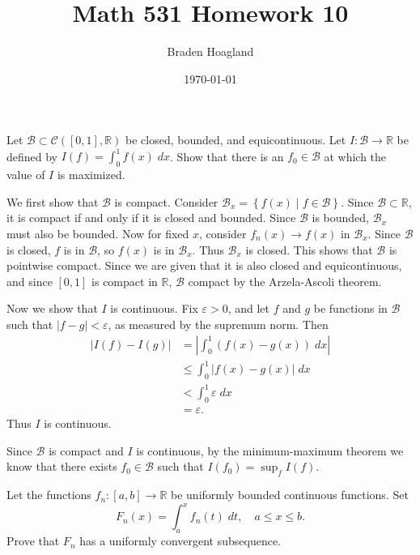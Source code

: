 \documentclass[10pt]{amsart}
\newenvironment{exercise}[1]{%
        \vspace{10mm}
        \renewcommand\themanualtheoreminner{#1}%
  \manualtheoreminner
}\hrulefill{\endmanualtheoreminner}
\begin{document}
\title{Math 531 Homework 10}
\author{Braden Hoagland}
\date{\today}
\maketitle

\begin{exercise}{Page 274, Ex. 4}
	Let $\mathcal{B}\subset \mathcal{C}([0,1], \mathbb{R})$ be closed, bounded, and equicontinuous. Let $I:\mathcal{B}\to\mathbb{R}$ be defined by $I(f) = \int_{0}^{1} f(x) \;dx$. Show that there is an $f_0 \in \mathcal{B}$ at which the value of $I$ is maximized.
\end{exercise}

We first show that $\mathcal{B}$ is compact. Consider $\mathcal{B}_x = \left\{ f(x) \;|\; f \in \mathcal{B} \right\}$. Since $\mathcal{B} \subset \mathbb{R}$, it is compact if and only if it is closed and bounded. Since $\mathcal{B}$ is bounded, $\mathcal{B}_x$ must also be bounded. Now for fixed $x$, consider $f_n(x) \to f(x)$ in $\mathcal{B}_x$. Since $\mathcal{B}$ is closed, $f$ is in $\mathcal{B}$, so $f(x)$ is in $\mathcal{B}_x$. Thus $\mathcal{B}_x$ is closed. This shows that $\mathcal{B}$ is pointwise compact. Since we are given that it is also closed and equicontinuous, and since $[0,1]$ is compact in $\mathbb{R}$, $\mathcal{B}$ compact by the Arzela-Ascoli theorem.

Now we show that $I$ is continuous. Fix $\varepsilon>0$, and let $f$ and $g$ be functions in $\mathcal{B}$ such that $|f-g| < \varepsilon$, as measured by the supremum norm. Then
\begin{align*}
	|I(f) - I(g)| &= \left| \int_{0}^{1} (f(x)-g(x)) \;dx \right| \\
		      &\leq \int_{0}^{1} |f(x)-g(x)| \;dx \\
		      &< \int_{0}^{1} \varepsilon \;dx \\
		      &= \varepsilon.
\end{align*}
Thus $I$ is continuous.

Since $\mathcal{B}$ is compact and $I$ is continuous, by the minimum-maximum theorem we know that there exists $f_0 \in \mathcal{B}$ such that $I(f_0) = \sup_f I(f)$.

\begin{exercise}{Page 275, Ex. 5}
	Let the functions $f_n:[a,b]\to\mathbb{R}$ be uniformly bounded continuous functions. Set
	\[
		F_n(x) = \int_{a}^{x} f_n(t) \;dt, \quad a \leq x \leq b.
	\] Prove that $F_n$ has a uniformly convergent subsequence.
\end{exercise}
\end{document}
